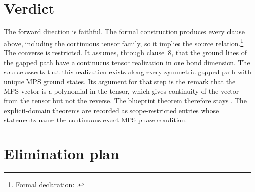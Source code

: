 \documentclass{article}
\begin{document}
\section{Verdict}

The forward direction is faithful. The formal construction produces every
clause above, including the continuous tensor family, so it implies the
source relation.\footnote{Formal declaration:
    .}
The converse is restricted. It assumes, through clause~8, that the ground
lines of the gapped path have a continuous tensor realization in one bond
dimension. The source asserts that this realization exists along every
symmetric gapped path with unique MPS ground states. Its argument for that
step is the remark that the MPS vector is a polynomial in the tensor, which
gives continuity of the vector from the tensor but not the reverse. The
blueprint theorem  therefore stays
. The explicit-domain theorems are recorded as
scope-restricted entries whose statements name the continuous exact MPS
phase condition.

\section{Elimination plan}
\end{document}
